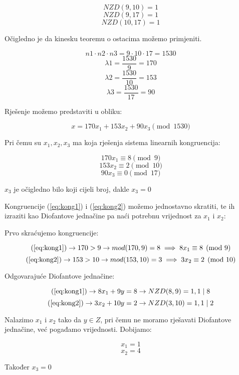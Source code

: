 \documentclass[12pt]{article}
\begin{document}
$$NZD(9, 10) = 1$$
$$NZD(9, 17) = 1$$
$$NZD(10, 17) = 1$$\vspace{1mm}

Očigledno je da kinesku teoremu o ostacima možemo primjeniti.

$$n1 \cdot n2 \cdot n3 = 9 \cdot 10 \cdot 17 = 1530$$\vspace{1mm}
$$\lambda 1 = \frac{1530}{9} = 170$$\vspace{1mm}
$$\lambda 2 = \frac{1530}{10} = 153$$\vspace{1mm}
$$\lambda 3 = \frac{1530}{17} = 90$$\vspace{1mm}

Rješenje možemo predstaviti u obliku:

$$x = 170x_{1} + 153x_{2} + 90x_{3} \pmod{1530}$$\vspace{1mm}

Pri čemu su $x_{1}, x_{2}, x_{3}$ ma koja rješenja sistema linearnih kongruencija:

\[
170x_{1} \equiv 8 \pmod{9} \label{eq:kong1} \tag{A}
\]
\[
153x_{2} \equiv 2 \pmod{10} \label{eq:kong2} \tag{B}
\]
$$90x_{3} \equiv 0 \pmod{17}$$

\begin{center}
$x_{3}$ je očigledno bilo koji cijeli broj, dakle $x_{3} = 0$
\end{center}\vspace{1mm}

Kongruencije (\ref{eq:kong1}) i (\ref{eq:kong2}) možemo jednostavno skratiti, te ih izraziti kao Diofantove jednačine pa naći potrebnu vrijednost za $x_{1}$ i $x_{2}$:

Prvo skraćujemo kongruencije:

$$(\ref{eq:kong1}) \to 170 > 9 \to mod(170, 9) = 8 \implies 8x_{1} \equiv 8 \pmod{9}$$
$$(\ref{eq:kong2}) \to 153 > 10 \to mod(153, 10) = 3 \implies 3x_{2} \equiv 2 \pmod{10}$$\vspace{1mm}

Odgovarajuće Diofantove jednačine:

$$(\ref{eq:kong1}) \to 8x_{1} + 9y = 8 \to NZD(8, 9) = 1, 1 \mid 8$$
$$(\ref{eq:kong2}) \to 3x_{2} + 10y = 2 \to NZD(3, 10) = 1, 1 \mid 2$$\vspace{1mm}

Nalazimo $x_{1}$ i $x_{2}$ tako da $y \in Z$, pri čemu ne moramo rješavati Diofantove jednačine, već pogađamo vrijednosti. Dobijamo:

$$x_{1} = 1$$
$$x_{2} = 4$$
\begin{center}
Također $x_{3} = 0$
\end{center}
\end{document}
